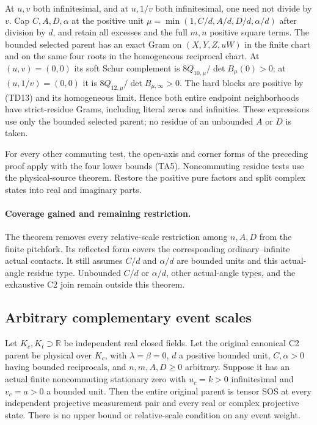 At $u,v$ both infinitesimal, and at $u,1/v$ both infinitesimal,
one need not divide by $v$. Cap $C,A,D,\alpha$ at the positive
unit $\mu=\min(1,C/d,A/d,D/d,\alpha/d)$ after division by $d$,
and retain all excesses and the full $m,n$ positive square terms. The bounded
selected parent has an exact Gram on $(X,Y,Z,uW)$ in the finite
chart and on the same four roots in the homogeneous reciprocal
chart. At $(u,v)=(0,0)$ its soft Schur complement is
$8Q_{10,\mu}/\det B_\mu(0)>0$; at $(u,1/v)=(0,0)$ it is
$8Q_{12,\mu}/\det B_{\mu,\infty}>0$. The hard blocks are positive
by (TD13) and its homogeneous limit. Hence both entire endpoint
neighborhoods have strict-residue Grams, including literal zeros
and infinities. These expressions use only the bounded selected
parent; no residue of an unbounded $A$ or $D$ is taken.

For every other commuting test, the open-axis and corner forms of the
preceding proof apply with the four lower bounds (TA5). Noncommuting
residue tests use the physical-source theorem. Restore the positive pure
factors and split complex states into real and imaginary parts.

\paragraph{Coverage gained and remaining restriction.}
The theorem removes every relative-scale restriction among $n,A,D$
from the finite pitchfork. Its reflected form covers the corresponding
ordinary--infinite actual contacts. It still assumes $C/d$ and
$\alpha/d$ are bounded units and this actual-angle residue type.
Unbounded $C/d$ or $\alpha/d$, other actual-angle types, and the
exhaustive C2 join remain outside this theorem.

\subsection{Arbitrary complementary event scales}
\label{component:pf7943b34a7dc}

\label{pf7943b34a7dc:sec:strong-complement-pitchfork}

\begin{theorem}
\label{pf7943b34a7dc:thm:strong-complement-pitchfork}
Let $K_c,K_t\supset\mathbb R$ be independent real closed fields.
Let the original canonical C2 parent be physical over $K_c$, with
$\lambda=\beta=0$, $d$ a positive bounded unit, $C,\alpha>0$
having bounded reciprocals, and $n,m,A,D\geq0$ arbitrary.
Suppose it has an actual finite noncommuting stationary zero with
$u_c=k>0$ infinitesimal and $v_c=a>0$ a bounded unit.
Then the entire original parent is tensor SOS at every independent
projective measurement pair and every real or complex projective state.
There is no upper bound or relative-scale condition on any event weight.
\end{theorem}

